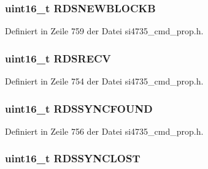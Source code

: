 \subsubsection[{R\+D\+S\+N\+E\+W\+B\+L\+O\+C\+K\+B}]{\setlength{\rightskip}{0pt plus 5cm}uint16\+\_\+t R\+D\+S\+N\+E\+W\+B\+L\+O\+C\+K\+B}\label{unionfm__rds__int__source_ae17ab7ac1a00946b1d73b05899a30202}


Definiert in Zeile 759 der Datei si4735\+\_\+cmd\+\_\+prop.\+h.

\hypertarget{unionfm__rds__int__source_af44cb84a104f9c29f31b0ac4bd89a601}{}
\subsubsection[{R\+D\+S\+R\+E\+C\+V}]{\setlength{\rightskip}{0pt plus 5cm}uint16\+\_\+t R\+D\+S\+R\+E\+C\+V}\label{unionfm__rds__int__source_af44cb84a104f9c29f31b0ac4bd89a601}


Definiert in Zeile 754 der Datei si4735\+\_\+cmd\+\_\+prop.\+h.

\hypertarget{unionfm__rds__int__source_a2cc7666ab88379a96c9b09cc3dec22cb}{}
\subsubsection[{R\+D\+S\+S\+Y\+N\+C\+F\+O\+U\+N\+D}]{\setlength{\rightskip}{0pt plus 5cm}uint16\+\_\+t R\+D\+S\+S\+Y\+N\+C\+F\+O\+U\+N\+D}\label{unionfm__rds__int__source_a2cc7666ab88379a96c9b09cc3dec22cb}


Definiert in Zeile 756 der Datei si4735\+\_\+cmd\+\_\+prop.\+h.

\hypertarget{unionfm__rds__int__source_aeca7437db524c8748f4ccd800033970d}{}
\subsubsection[{R\+D\+S\+S\+Y\+N\+C\+L\+O\+S\+T}]{\setlength{\rightskip}{0pt plus 5cm}uint16\+\_\+t R\+D\+S\+S\+Y\+N\+C\+L\+O\+S\+T}\label{unionfm__rds__int__source_aeca7437db524c8748f4ccd800033970d}


